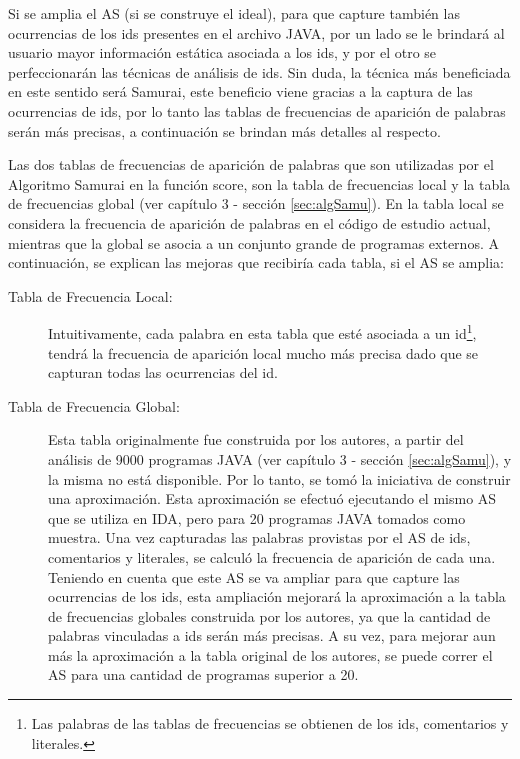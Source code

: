 Si se amplia el AS (si se construye el ideal), para que capture también las ocurrencias de los ids presentes en el archivo JAVA, por un lado se le brindará al usuario mayor información estática asociada a los ids, y por el otro se perfeccionarán las técnicas de análisis de ids. 
Sin duda, la técnica más beneficiada en este sentido será Samurai, este beneficio viene gracias a la 
captura de las ocurrencias de ids, por lo tanto las tablas de frecuencias de aparición de palabras serán más precisas, a continuación se brindan más detalles al respecto.

Las dos tablas de frecuencias de aparición de palabras que son utilizadas por el Algoritmo Samurai en la función score, son la tabla de frecuencias local y la tabla de frecuencias global (ver capítulo 3 - sección \ref{sec:algSamu}). 
En la tabla local se considera la frecuencia de aparición de palabras en el código de estudio actual, mientras que la global se asocia a un conjunto grande de programas externos. A continuación, se explican las mejoras que recibiría cada tabla, si el AS se amplia:

\begin{description}
\item[Tabla de Frecuencia Local:] Intuitivamente, cada palabra en esta tabla que esté asociada a un id\footnote[1]{Las palabras de las tablas de frecuencias se obtienen de los ids, comentarios y literales.}, tendrá la frecuencia de aparición local mucho más precisa dado que se capturan todas las ocurrencias del id.

\item[Tabla de Frecuencia Global:] Esta tabla originalmente fue construida por los autores, a partir del análisis de 9000 programas JAVA (ver capítulo 3 - sección \ref{sec:algSamu}), y la misma no está disponible. Por lo tanto, se tomó la iniciativa de construir una aproximación. Esta aproximación se efectuó ejecutando el mismo AS que se utiliza en IDA, pero para 20 programas JAVA tomados como muestra. Una vez capturadas las palabras provistas por el AS de ids, comentarios y literales, se calculó la frecuencia de aparición de cada una.
Teniendo en cuenta que este AS se va ampliar para que capture las ocurrencias de los ids, esta ampliación mejorará la aproximación a la tabla de frecuencias globales construida por los autores, ya que la cantidad de palabras vinculadas a ids serán más precisas. A su vez, para mejorar aun más la aproximación a la tabla original de los autores, se puede correr el AS para una cantidad de programas superior a 20.

\end{description}


